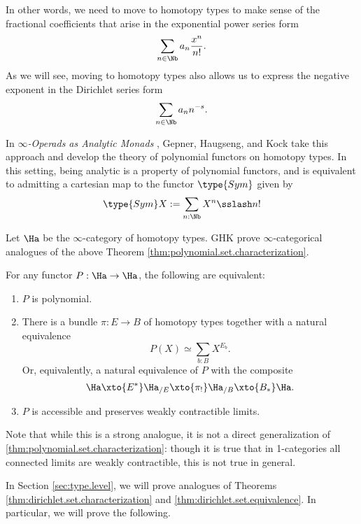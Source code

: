 In other words, we need to move to homotopy types to make sense of the
fractional coefficients that arise in the exponential power series form
$$\sum_{n \in \Nb} a_n \frac{x^n}{n!}.$$
As we will see, moving to homotopy types also allows us to express the negative
exponent in the Dirichlet series form
$$\sum_{n \in \Nb} a_n n^{-s}.$$

In \emph{$\infty$-Operads as Analytic Monads} \cite{GHK:Analytic.Monads},
Gepner, Haugseng, and Kock take this approach and develop the theory of
polynomial functors on homotopy types. In this setting, being analytic is a
property of  polynomial functors, and is equivalent to admitting a cartesian
map to the functor $\type{Sym}$ given by
$$\type{Sym}X := \sum_{n : \Nb} X^n \sslash n!$$

Let $\Ha$ be the $\infty$-category of homotopy types. GHK prove $\infty$-categorical analogues of the above Theorem
\ref{thm:polynomial.set.characterization}.
\begin{thm}\label{thm:polynomial.type.characterization}
For any functor $P : \Ha \to \Ha$, the following are equivalent:
  \begin{enumerate}
  \item $P$ is polynomial.
  \item There is a bundle $\pi : E \to B$ of homotopy types together with a natural equivalence
    $$P(X) \simeq \sum_{b : B} X^{E_b}.$$
    Or, equivalently, a natural equivalence of $P$ with the composite
    $$\Ha \xto{E^{\ast}} \Ha_{/E} \xto{\pi_!} \Ha_{/B} \xto{B_\ast} \Ha.$$
  \item $P$ is accessible and preserves weakly contractible limits.
  \end{enumerate}
\end{thm}

Note that while this is a strong analogue, it is not a direct generalization of \cref{thm:polynomial.set.characterization}:
though it is true that in 1-categories all connected limits are weakly contractible, this is not true in general.

In Section \ref{sec:type.level}, we will prove analogues of Theorems
\ref{thm:dirichlet.set.characterization} and
\ref{thm:dirichlet.set.equivalence}.  In particular, we will prove the following.

